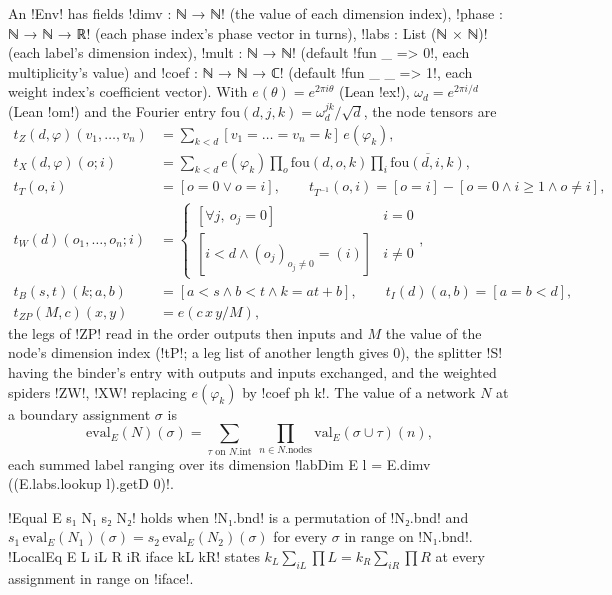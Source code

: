 {\begin{definition}\label{def:lean-export-net-env}
An \lean!Env! has fields \lean!dimv : ℕ → ℕ! (the value of each dimension index),
\leanx!phase : ℕ → ℕ → ℝ! (each phase index's phase vector in turns),
\lean!labs : List (ℕ × ℕ)! (each label's dimension index), \lean!mult : ℕ → ℕ! (default
\lean!fun _ => 0!, each multiplicity's value) and \lean!coef : ℕ → ℕ → ℂ! (default
\lean!fun _ _ => 1!, each weight index's coefficient vector). With $e(\theta) = e^{2\pi i\theta}$
(Lean \lean!ex!), $\omega_d = e^{2\pi i/d}$ (Lean \lean!om!) and the Fourier entry
$\mathrm{fou}(d,j,k) = \omega_d^{jk}/\sqrt d$, the node tensors are
\begin{align*}
  t_Z(d,\varphi)(v_1,\dots,v_n) &= \textstyle\sum_{k<d} [v_1=\dots=v_n=k]\, e(\varphi_k),\\
  t_X(d,\varphi)(o;i) &= \textstyle\sum_{k<d} e(\varphi_k) \prod_o \mathrm{fou}(d,o,k)
     \prod_i \overline{\mathrm{fou}(d,i,k)},\\
  t_T(o,i) &= [o=0 \lor o=i], \qquad
  t_{T^{-1}}(o,i) = [o=i] - [o=0 \land i\ge 1 \land o \ne i],\\
  t_W(d)(o_1,\dots,o_n;i) &= \begin{cases}[\forall j,\ o_j=0] & i=0\\
     [i<d \land (o_j)_{o_j\ne0} = (i)] & i\ne0\end{cases},\\
  t_B(s,t)(k;a,b) &= [a<s \land b<t \land k = a t + b], \qquad t_I(d)(a,b) = [a=b<d],\\
  t_{ZP}(M, c)(x, y) &= e(c\,x\,y/M),
\end{align*}
the legs of \lean!ZP! read in the order outputs then inputs and $M$ the value of the node's
dimension index (\lean!tP!; a leg list of another length gives 0),
the splitter \lean!S! having the binder's entry with outputs and inputs exchanged, and the
weighted spiders \lean!ZW!, \lean!XW! replacing $e(\varphi_k)$ by \lean!coef ph k!. The value of
a network $N$ at a boundary assignment $\sigma$ is
\[
  \mathrm{eval}_E(N)(\sigma) = \sum_{\tau \text{ on } N.\mathrm{int}}\ \prod_{n\in N.\mathrm{nodes}}
  \mathrm{val}_E(\sigma\cup\tau)(n),
\]
each summed label ranging over its dimension \lean!labDim E l = E.dimv ((E.labs.lookup l).getD 0)!.
\end{definition}

\begin{definition}\label{def:lean-export-net-equal}
\lean!Equal E s₁ N₁ s₂ N₂! holds when \lean!N₁.bnd! is a permutation of \lean!N₂.bnd! and
$s_1\,\mathrm{eval}_E(N_1)(\sigma) = s_2\,\mathrm{eval}_E(N_2)(\sigma)$ for every $\sigma$ in range
on \lean!N₁.bnd!. \lean!LocalEq E L iL R iR iface kL kR! states
$k_L \sum_{iL}\prod L = k_R\sum_{iR}\prod R$ at every assignment in range on \lean!iface!.
\end{definition}

}
